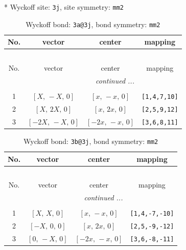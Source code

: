 \documentclass[fleqn,8pt]{jsarticle}
\begin{document}
* Wyckoff site: {\tt 3j}, site symmetry: {\tt mm2}
\renewcommand{\arraystretch}{1.2}
\begin{longtable}{cccc}
\caption{Wyckoff bond: {\tt 3a@3j}, bond symmetry: {\tt mm2}}
 \\
 \hline \hline
No. & vector & center & mapping \\ \hline \endfirsthead

\multicolumn{3}{l}{\tablename\ \thetable{}} \\
 \hline \hline
No. & vector & center & mapping \\ \hline \endhead

 \hline \hline
\multicolumn{3}{r}{\footnotesize\it continued ...} \\ \endfoot

 \hline \hline
\multicolumn{3}{r}{} \\ \endlastfoot

1 & $\left[ X,\, - X,\, 0 \right]$ & $\left[ x,\, - x,\, 0 \right]$ & {\tt [1,4,7,10]} \\ \hline
2 & $\left[ X,\, 2 X,\, 0 \right]$ & $\left[ x,\, 2 x,\, 0 \right]$ & {\tt [2,5,9,12]} \\ \hline
3 & $\left[ - 2 X,\, - X,\, 0 \right]$ & $\left[ - 2 x,\, - x,\, 0 \right]$ & {\tt [3,6,8,11]} \\
\end{longtable}
\renewcommand{\arraystretch}{1.2}
\begin{longtable}{cccc}
\caption{Wyckoff bond: {\tt 3b@3j}, bond symmetry: {\tt mm2}}
 \\
 \hline \hline
No. & vector & center & mapping \\ \hline \endfirsthead

\multicolumn{3}{l}{\tablename\ \thetable{}} \\
 \hline \hline
No. & vector & center & mapping \\ \hline \endhead

 \hline \hline
\multicolumn{3}{r}{\footnotesize\it continued ...} \\ \endfoot

 \hline \hline
\multicolumn{3}{r}{} \\ \endlastfoot

1 & $\left[ X,\, X,\, 0 \right]$ & $\left[ x,\, - x,\, 0 \right]$ & {\tt [1,4,-7,-10]} \\ \hline
2 & $\left[ - X,\, 0,\, 0 \right]$ & $\left[ x,\, 2 x,\, 0 \right]$ & {\tt [2,5,-9,-12]} \\ \hline
3 & $\left[ 0,\, - X,\, 0 \right]$ & $\left[ - 2 x,\, - x,\, 0 \right]$ & {\tt [3,6,-8,-11]} \\
\end{longtable}
\end{document}
